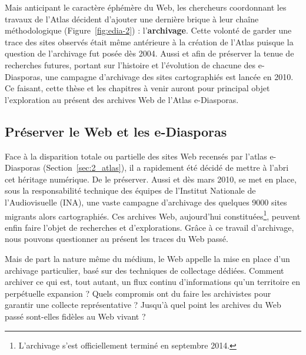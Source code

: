 \documentclass[symmetric,justified,marginals=raggedouter]{tufte-book}
\begin{document}
Mais anticipant le caractère éphémère du Web, les chercheurs coordonnant les travaux de l'Atlas décident d'ajouter une dernière brique à leur chaîne méthodologique (Figure~\ref{fig:edia-2}) : l'\textbf{archivage}. Cette volonté de garder une trace des sites observés était même antérieure à la création de l'Atlas puisque la question de l'archivage fut posée dès 2004. Aussi et afin de préserver la tenue de recherches futures, portant sur l'histoire et l'évolution de chacune des e-Diasporas, une campagne d'archivage des sites cartographiés est lancée en 2010. Ce faisant, cette thèse et les chapitres à venir auront pour principal objet l'exploration au présent des archives Web de l'Atlas e-Diasporas.     


\cleardoublepage
\begin{minipage}[t,leftmargin=5em]{1.5\linewidth}%
\begin{adjustwidth}{-0.5cm}{}
\chapter{Préserver le Web et les e-Diasporas}
\label{chap:3}
\end{adjustwidth}
\end{minipage}
\hfill

\noindent Face à la disparition totale ou partielle des sites Web recensés par l'atlas e-Diasporas (Section~\ref{sec:2_atlas}), il a rapidement été décidé de mettre à l'abri cet héritage numérique. De le préserver. Aussi et dès mars 2010, se met en place, sous la responsabilité technique des équipes de l'Institut Nationale de l'Audiovisuelle (INA), une vaste campagne d'archivage des quelques 9000 sites migrants alors cartographiés. Ces archives Web, aujourd'hui constituées\footnote{\RaggedOuter L'archivage s'est officiellement terminé en septembre 2014.}, peuvent enfin faire l'objet de recherches et d'explorations. Grâce à ce travail d'archivage, nous pouvons questionner au présent les traces du Web passé. 

Mais de part la nature même du médium, le Web appelle la mise en place d'un archivage particulier, basé sur des techniques de collectage dédiées. Comment archiver ce qui est, tout autant, un flux continu d'informations qu'un territoire en perpétuelle expansion ? Quels compromis ont du faire les archivistes pour garantir une collecte représentative ? Jusqu'à quel point les archives du Web passé sont-elles fidèles au Web vivant ? 
\end{document}
